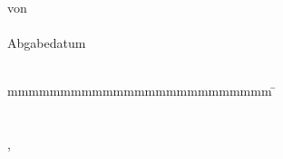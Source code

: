 \begin{titlepage}
\begin{center}
    \vspace{9mm}	von\\ \large{} %
    \vspace{1mm} 	{\large\textbf{\authorOne}}\\
    \vspace{6mm}	Abgabedatum\\
    \vspace{2mm}		\submissionDate\\
  \end{center}
  \vspace{10mm}
  \vspace{-4mm}
  \begin{spacing}{1.5}
    \begin{tabbing}
      mmmmmmmmmmmmmmmmmmmmmmmmm   		\= \kill
      \textbf{\projectTimeframeText}  		\>  \projectTimeframe\\
      \textbf{\matriculationNumberText}  	\>  \matriculationNumber \\
      \textbf{\courseText}							\>	\course\\
      \textbf{\companyText}      	\>  \company, \companyLocation\\
      \textbf{\tutorText}              	\>  \tutor\\
      \textbf{\secondTutorText}              	\>  \secondTutor
    \end{tabbing}
  \end{spacing}
\end{titlepage}

\restoregeometry
\fancyheadoffset{0pt}
